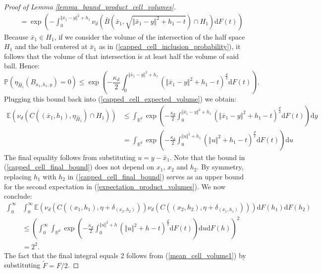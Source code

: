 \documentclass[10pt,a4paper]{amsart}
\newcommand{\EE}{\mathbb{E}}
\newcommand{\PP}{\mathbb{P}}
\newcommand{\RR}{\mathbb{R}}
\begin{document}
\begin{proof}[Proof of Lemma \ref{lemma_bound_product_cell_volumes}]
{\begin{align}
        &= \exp\left(-\int_0^{\Vert\bar{x}_1 - y \Vert^2 + h_1} \nu_d\left(\bar{B}\left(\bar{x}_1,\sqrt{\Vert\bar{x}_1 - y \Vert^2 + h_1 - t} \right)\cap H_1 \right) \mathrm{d}F(t)\right) \label{capped_cell_inclusion_probability}
    \end{align}
    }%
    Because $\bar{x}_1 \in H_1$, if we consider the volume of the intersection of the half space $H_1$ and the ball centered at $\bar{x}_1$ as in (\ref{capped_cell_inclusion_probability}), it follows that the volume of that intersection is at least half the volume of said ball. Hence:
    \[\PP\left(\eta_{\hat{H}_1}\left(B_{\bar{x}_1,h_1,y} \right) = 0 \right) \leq \exp\left(-\frac{\kappa_d}{2}\int_0^{\Vert\bar{x}_1 - y \Vert^2 + h_1}\left(\Vert \bar{x}_1  - y\Vert^2 + h_1 - t \right)^\frac{d}{2}  \mathrm{d}F(t)\right).\]
    Plugging this bound back into (\ref{capped_cell_expected_volume}) we obtain:
    \begin{align}
        \EE\left(\nu_d\left(C\left((\bar{x}_1,h_1),\eta_{\hat{H}_1}\right)\cap H_1\right)\right) &\leq \int_{\RR^d} \exp\left(-\frac{\kappa_d}{2}\int_0^{\Vert\bar{x}_1 - y \Vert^2 + h_1}\left(\Vert \bar{x}_1  - y\Vert^2 + h_1 - t \right)^\frac{d}{2}  \mathrm{d}F(t)\right)\mathrm{d}y \nonumber \\
        &= \int_{\RR^d} \exp\left(-\frac{\kappa_d}{2}\int_0^{\Vert u \Vert^2 + h_1}\left(\Vert u\Vert^2 + h_1 - t \right)^\frac{d}{2}  \mathrm{d}F(t)\right)\mathrm{d}u \label{capped_cell_final_bound}
    \end{align}
    The final equality follows from substituting $u = y - \bar{x}_1$. Note that the bound in (\ref{capped_cell_final_bound}) does not depend on $x_1$, $x_2$ and $h_2$. By symmetry, replacing $h_1$ with $h_2$ in (\ref{capped_cell_final_bound}) serves as an upper bound for the second expectation in (\ref{expectation_product_volumes}). We now conclude:
    \begin{align*}
        \int_0^\infty &\int_0^\infty \EE\left(\nu_d(C((x_1,h_1),\eta+\delta_{(x_2,h_2)}))\nu_d(C((x_2,h_2),\eta+\delta_{(x_1,h_1)})) \right)\mathrm{d}F(h_1)\mathrm{d}F(h_2)  \\
        &\leq \left(\int_0^\infty \int_{\RR^d} \exp\left(-\frac{\kappa_d}{2}\int_0^{\Vert u \Vert^2 + h}\left(\Vert u\Vert^2 + h - t \right)^\frac{d}{2}  \mathrm{d}F(t)\right)\mathrm{d}u\mathrm{d}F(h)\right)^2 \\
        &= 2^2.
    \end{align*}
    The fact that the final integral equals 2 follows from (\ref{mean_cell_volume1}) by substituting $\tilde{F} = F/2$.
\end{proof}
\end{document}
